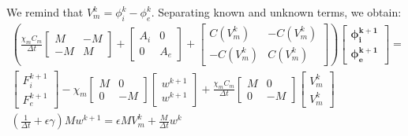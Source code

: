 \documentclass[a4paper,11pt]{article}
\begin{document}
We remind that $V_m^k=\phi_i^k-\phi_e^k$. Separating known and unknown terms, we obtain: \vspace{3mm}
\begin{equation}
\begin{gathered}
\left( \frac{\chi_m C_m}{\Delta t} \begin{bmatrix} M & -M \\ -M & M \end{bmatrix} + \begin{bmatrix} A_i & 0 \\ 0 & A_e \end{bmatrix} + 
\begin{bmatrix}
C(V_m^k) & -C(V_m^k) \\ -C(V_m^k) & C(V_m^k)
\end{bmatrix}\right)
\begin{bmatrix} \bm{\phi_i^{k+1}} \\ \bm{\phi_e^{k+1}} \end{bmatrix} = 
\\
\begin{bmatrix} F_i^{k+1} \\ F_e^{k+1} \end{bmatrix} 
- \chi_m \begin{bmatrix}M & 0 \\ 0 & -M \end{bmatrix}
\begin{bmatrix} w^{k+1} \\ w^{k+1} \end{bmatrix}
+ \frac{\chi_m C_m}{\Delta t} \begin{bmatrix}M & 0 \\ 0 & -M\end{bmatrix}
\begin{bmatrix} V_m^{k} \\ V_m^{k} \end{bmatrix} \\
(\frac{1}{\Delta t}+\epsilon \gamma)M w^{k+1}=\epsilon M V_m^k+\frac{M}{\Delta t} w^k
\end{gathered}
\end{equation}
\end{document}
